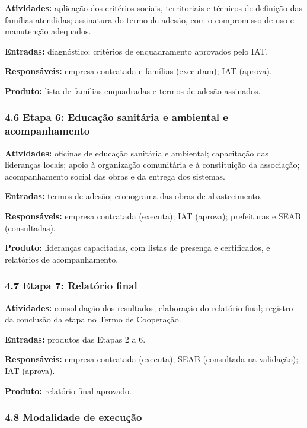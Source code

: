 \textbf{Atividades:} aplicação dos critérios sociais, territoriais e técnicos de definição das famílias atendidas; assinatura do termo de adesão, com o compromisso de uso e manutenção adequados.

\textbf{Entradas:} diagnóstico; critérios de enquadramento aprovados pelo IAT.

\textbf{Responsáveis:} empresa contratada e famílias (executam); IAT (aprova).

\textbf{Produto:} lista de famílias enquadradas e termos de adesão assinados.

\subsubsection*{4.6 Etapa 6: Educação sanitária e ambiental e acompanhamento}

\textbf{Atividades:} oficinas de educação sanitária e ambiental; capacitação das lideranças locais; apoio à organização comunitária e à constituição da associação; acompanhamento social das obras e da entrega dos sistemas.

\textbf{Entradas:} termos de adesão; cronograma das obras de abastecimento.

\textbf{Responsáveis:} empresa contratada (executa); IAT (aprova); prefeituras e SEAB (consultadas).

\textbf{Produto:} lideranças capacitadas, com listas de presença e certificados, e relatórios de acompanhamento.

\subsubsection*{4.7 Etapa 7: Relatório final}

\textbf{Atividades:} consolidação dos resultados; elaboração do relatório final; registro da conclusão da etapa no Termo de Cooperação.

\textbf{Entradas:} produtos das Etapas 2 a 6.

\textbf{Responsáveis:} empresa contratada (executa); SEAB (consultada na validação); IAT (aprova).


\textbf{Produto:} relatório final aprovado.

\subsubsection*{4.8 Modalidade de execução}

